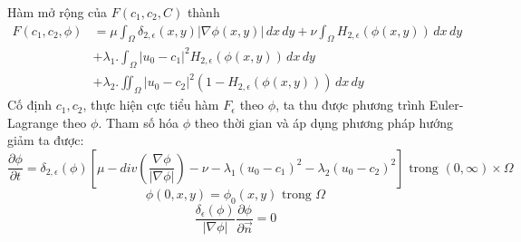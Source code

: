 \documentclass[12pt, oneside, a4]{book}
\begin{document}
 Hàm mở rộng của $F(c_1,c_2,C)$ thành
\begin{equation*}
\begin{split}
F(c_1, c_2, \phi)&=\mu \int_{\Omega}\delta_{2,\epsilon}(x,y)|\nabla \phi(x,y)|\,dx\,dy+\nu  \int_{\Omega}H_{2,\epsilon}( \phi(x,y))\,dx\,dy \\ 
&+\lambda_1 .\int_{\Omega} |u_0-c_1|^2H_{2,\epsilon}(\phi(x,y)) \,dx\,dy\\&+\lambda_2 .\iint_{\Omega} |u_0-c_2|^2(1-H_{2,\epsilon}(\phi(x,y))) \,dx\,dy
\end{split}
\end{equation*}
Cố định $c_1, c_2$, thực hiện cực tiểu hàm $F_{\epsilon}$ theo $\phi$, ta thu được phương trình Euler-Lagrange theo $\phi$. Tham số hóa $\phi$ theo thời gian và áp dụng phương pháp hướng giảm ta được:
\begin{equation}
\dfrac{\partial \phi}{\partial t}= \delta_{2,\epsilon}(\phi)[\mu- div(\dfrac{\nabla \phi}{|\nabla \phi|})- \nu- \lambda_1 (u_0-c_1)^2-\lambda_2 (u_0-c_2)^2]  \text{ trong } (0,\infty)\times \Omega
\end{equation}
\begin{equation}
\phi(0,x,y)=\phi_0(x,y) \text{ trong } \Omega 
\end{equation}
\begin{equation}
\dfrac{\delta_{\epsilon}(\phi)}{|\nabla \phi|}\dfrac{\partial \phi}{\partial \vec{n}}=0
\end{equation}
\end{document}
